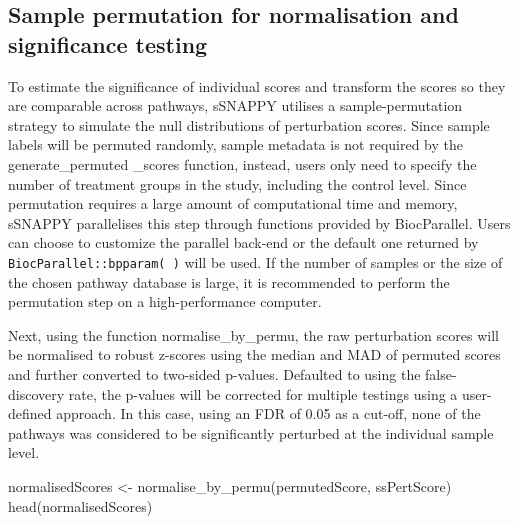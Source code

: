 \documentclass[9pt,a4paper,]{extarticle}
\newenvironment{Shaded}{\begin{snugshade}}{\end{snugshade}}
\newcommand{\AttributeTok}[1]{\textcolor[rgb]{0.77,0.63,0.00}{#1}}
\newcommand{\DecValTok}[1]{\textcolor[rgb]{0.00,0.00,0.81}{#1}}
\newcommand{\FunctionTok}[1]{\textcolor[rgb]{0.00,0.00,0.00}{#1}}
\newcommand{\NormalTok}[1]{#1}
\newcommand{\OtherTok}[1]{\textcolor[rgb]{0.56,0.35,0.01}{#1}}
\newcommand{\SpecialCharTok}[1]{\textcolor[rgb]{0.00,0.00,0.00}{#1}}
\begin{document}
\hypertarget{sample-permutation-for-normalisation-and-significance-testing}{%
\subsection{Sample permutation for normalisation and significance testing}\label{sample-permutation-for-normalisation-and-significance-testing}}

To estimate the significance of individual scores and transform the scores so they are comparable across pathways, sSNAPPY utilises a sample-permutation strategy to simulate the null distributions of perturbation scores. Since sample labels will be permuted randomly, sample metadata is not required by the generate\_permuted \_scores function, instead, users only need to specify the number of treatment groups in the study, including the control level. Since permutation requires a large amount of computational time and memory, sSNAPPY parallelises this step through functions provided by BiocParallel. Users can choose to customize the parallel back-end or the default one returned by \texttt{BiocParallel::bpparam(\ )} will be used. If the number of samples or the size of the chosen pathway database is large, it is recommended to perform the permutation step on a high-performance computer.

\begin{Shaded}
\end{Shaded}

Next, using the function normalise\_by\_permu, the raw perturbation scores will be normalised to robust z-scores using the median and MAD of permuted scores and further converted to two-sided p-values. Defaulted to using the false-discovery rate, the p-values will be corrected for multiple testings using a user-defined approach. In this case, using an FDR of 0.05 as a cut-off, none of the pathways was considered to be significantly perturbed at the individual sample level.

\begin{Shaded}
\begin{Highlighting}[]
\NormalTok{normalisedScores }\OtherTok{\textless{}{-}} \FunctionTok{normalise\_by\_permu}\NormalTok{(permutedScore, ssPertScore)}
\FunctionTok{head}\NormalTok{(normalisedScores)}
\end{Highlighting}
\end{Shaded}
\end{document}
